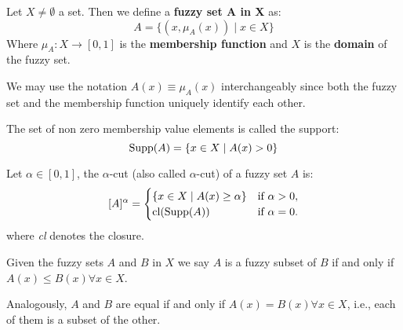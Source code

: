 
\begin{definition}
    Let $X\neq\emptyset$ a set. Then we define a \textbf{fuzzy set A in X} as:
    \[A=\{(x,\mu_A(x))\mid x\in X\}\]
    Where $\mu_A:X\longrightarrow [0,1]$ is the \textbf{membership function} and $X$ is the \textbf{domain} of the fuzzy set.
\end{definition}

\begin{remark}
    We may use the notation \( A(x) \equiv \mu_A(x) \) interchangeably since both the fuzzy set and the membership function uniquely identify each other.
\end{remark}

\begin{definition}[Support]
    The set of non zero membership value elements is called the support:
    \[\textnormal{Supp}(A)=\{x\in X \mid A(x)>0\}\]
\end{definition}

\begin{definition}
    Let $\alpha \in [0,1]$, the $\alpha$-cut (also called $\alpha$-cut) of a fuzzy set \( A \) is:
    \[
    [A]^\alpha =
    \begin{cases}
    \{x \in X \mid A(x)\geq \alpha\} & \text{if } \alpha > 0, \\
    \textnormal{cl}(\textnormal{Supp}(A)) & \text{if } \alpha = 0.
    \end{cases}
    \]
    where \textit{cl} denotes the closure.
\end{definition}



\begin{definition}
    Given the fuzzy sets $A$ and $B$ in $X$ we say $A$ is a fuzzy subset of $B$ if and only if $A(x)
    \leq B(x) \forall x \in X$.

    Analogously, $A$ and $B$ are equal if and only if $A(x)=B(x) \forall x \in X$, i.e., each of them is a subset of the other.
\end{definition}

